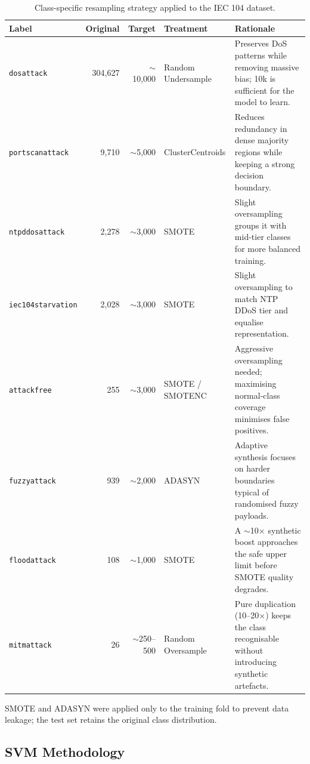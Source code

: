\documentclass{article}
\begin{document}
\begin{table}[ht]
  \caption{Class-specific resampling strategy applied to the IEC 104 dataset.}
  \label{tab:resampling}
  \centering
  \setlength{\tabcolsep}{4pt}
  \footnotesize
  \begin{tabular}{lrrp{2.3cm}p{5.0cm}}
    \toprule
    \textbf{Label} & \textbf{Original} & \textbf{Target} & \textbf{Treatment} & \textbf{Rationale} \\
    \midrule
    \texttt{dosattack}        & 304,627 & $\sim$10,000   & Random Undersample  & Preserves DoS patterns while removing massive bias; 10k is sufficient for the model to learn. \\
    \texttt{portscanattack}   & 9,710   & $\sim$5,000    & ClusterCentroids    & Reduces redundancy in dense majority regions while keeping a strong decision boundary. \\
    \texttt{ntpddosattack}    & 2,278   & $\sim$3,000    & SMOTE               & Slight oversampling groups it with mid-tier classes for more balanced training. \\
    \texttt{iec104starvation} & 2,028   & $\sim$3,000    & SMOTE               & Slight oversampling to match NTP DDoS tier and equalise representation. \\
    \texttt{attackfree}       & 255     & $\sim$3,000    & SMOTE / SMOTENC     & Aggressive oversampling needed; maximising normal-class coverage minimises false positives. \\
    \texttt{fuzzyattack}      & 939     & $\sim$2,000    & ADASYN              & Adaptive synthesis focuses on harder boundaries typical of randomised fuzzy payloads. \\
    \texttt{floodattack}      & 108     & $\sim$1,000    & SMOTE               & A $\sim$10$\times$ synthetic boost approaches the safe upper limit before SMOTE quality degrades. \\
    \texttt{mitmattack}       & 26      & $\sim$250--500 & Random Oversample   & Pure duplication (10--20$\times$) keeps the class recognisable without introducing synthetic artefacts. \\
    \bottomrule
  \end{tabular}
\end{table}

SMOTE and ADASYN were applied only to the training fold to prevent data leakage; the test set retains the original class distribution.

\subsection{SVM Methodology}
\end{document}
